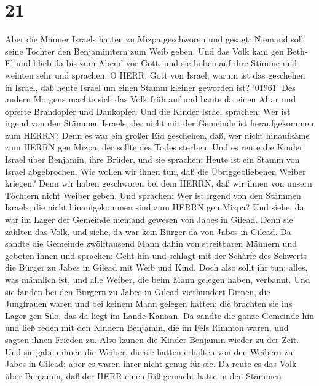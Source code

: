 \hypertarget{section-20}{%
\section{21}\label{section-20}}

 Aber die Männer Israels hatten zu Mizpa geschworen und
gesagt: Niemand soll seine Tochter den Benjaminitern zum Weib geben.
 Und das Volk kam gen Beth-El und blieb da bis zum Abend vor
Gott, und sie hoben auf ihre Stimme und weinten sehr  und
sprachen: O HERR, Gott von Israel, warum ist das geschehen in Israel,
daß heute Israel um einen Stamm kleiner geworden ist? 
`01961' Des andern Morgens machte sich das Volk früh auf und baute da
einen Altar und opferte Brandopfer und Dankopfer.  Und die
Kinder Israel sprachen: Wer ist irgend von den Stämmen Israels, der
nicht mit der Gemeinde ist heraufgekommen zum HERRN? Denn es war ein
großer Eid geschehen, daß, wer nicht hinaufkäme zum HERRN gen Mizpa, der
sollte des Todes sterben.  Und es reute die Kinder Israel
über Benjamin, ihre Brüder, und sie sprachen: Heute ist ein Stamm von
Israel abgebrochen.  Wie wollen wir ihnen tun, daß die
Übriggebliebenen Weiber kriegen? Denn wir haben geschworen bei dem
HERRN, daß wir ihnen von unsern Töchtern nicht Weiber geben.
 Und sprachen: Wer ist irgend von den Stämmen Israels, die
nicht hinaufgekommen sind zum HERRN gen Mizpa? Und siehe, da war im
Lager der Gemeinde niemand gewesen von Jabes in Gilead. 
Denn sie zählten das Volk, und siehe, da war kein Bürger da von Jabes in
Gilead.  Da sandte die Gemeinde zwölftausend Mann dahin von
streitbaren Männern und geboten ihnen und sprachen: Geht hin und schlagt
mit der Schärfe des Schwerts die Bürger zu Jabes in Gilead mit Weib und
Kind.  Doch also sollt ihr tun: alles, was männlich ist,
und alle Weiber, die beim Mann gelegen haben, verbannt. 
Und sie fanden bei den Bürgern zu Jabes in Gilead vierhundert Dirnen,
die Jungfrauen waren und bei keinem Mann gelegen hatten; die brachten
sie ins Lager gen Silo, das da liegt im Lande Kanaan.  Da
sandte die ganze Gemeinde hin und ließ reden mit den Kindern Benjamin,
die im Fels Rimmon waren, und sagten ihnen Frieden zu. 
Also kamen die Kinder Benjamin wieder zu der Zeit. Und sie gaben ihnen
die Weiber, die sie hatten erhalten von den Weibern zu Jabes in Gilead;
aber es waren ihrer nicht genug für sie.  Da reute es das
Volk über Benjamin, daß der HERR einen Riß gemacht hatte in den Stämmen
